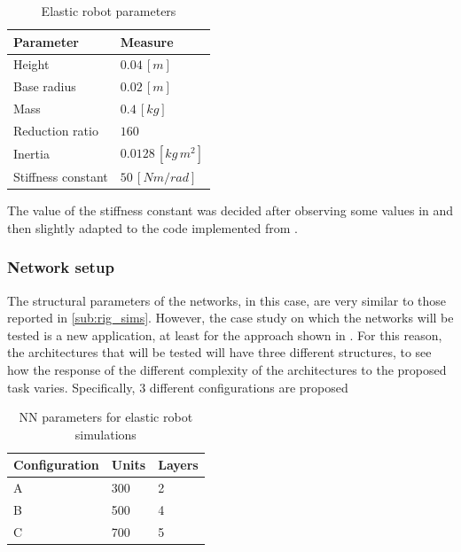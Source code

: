 \documentclass[a4paper]{article}
\begin{document}
\begin{table}
\centering
\caption{Elastic robot parameters}
\begin{tabular}{P{4.5cm}P{2.5cm}} 
\hline\hline
 \textbf{Parameter} & \textbf{Measure} \\ 
\hline
 Height & $0.04\, [m]$\\ 
\hline
 Base radius & $0.02\, [m]$\\ 
\hline
 Mass & $0.4\, [kg]$\\ 
\hline
 Reduction ratio & $160$\\
\hline
 Inertia & $0.0128\, [kg\,m^2]$\\
\hline
 Stiffness constant & $50\, [Nm/rad]$\\
\hline\hline
\end{tabular}
\end{table}

The value of the stiffness constant was decided after observing some values in \cite{giusti} and then slightly adapted to the code implemented from \cite{lnncranmer}.

\subsubsection{Network setup}
\label{subsubsec:nn_elastic}
The structural parameters of the networks, in this case, are very similar to those reported in \ref{sub:rig_sims}. However, the case study on which the networks will be tested is a new application, at least for the approach shown in \cite{lnncranmer}. For this reason, the architectures that will be tested will have three different structures, to see how the response of the different complexity of the architectures to the proposed task varies. Specifically, 3 different configurations are proposed

\begin{table}
    \centering
    \caption{NN parameters for elastic robot simulations}
    \begin{tabular}{P{2.5cm}P{2.5cm}P{2.5cm}} 
    \hline\hline
    \textbf{Configuration} & \textbf{Units} & \textbf{Layers} \\ 
    \hline
     A & 300 & 2\\
    \hline
     B & 500 & 4\\
     \hline
     C & 700 & 5\\
    \hline\hline
    \end{tabular}
    \label{tab:elastic_networks}    
\end{table}
\end{document}
